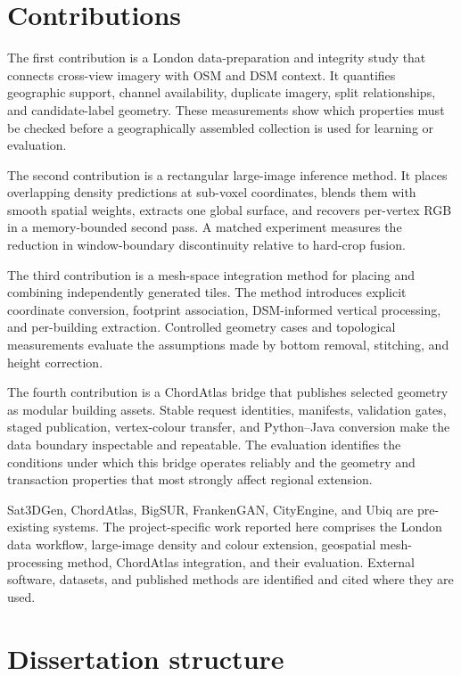 \section{Contributions}

The first contribution is a London data-preparation and integrity study that
connects cross-view imagery with OSM and DSM context.  It quantifies geographic
support, channel availability, duplicate imagery, split relationships, and
candidate-label geometry.  These measurements show which properties must be
checked before a geographically assembled collection is used for learning or
evaluation.

The second contribution is a rectangular large-image inference method.  It
places overlapping density predictions at sub-voxel coordinates, blends them
with smooth spatial weights, extracts one global surface, and recovers
per-vertex RGB in a memory-bounded second pass.  A matched experiment measures
the reduction in window-boundary discontinuity relative to hard-crop fusion.

The third contribution is a mesh-space integration method for placing and
combining independently generated tiles.  The method introduces explicit
coordinate conversion, footprint association, DSM-informed vertical
processing, and per-building extraction.  Controlled geometry cases and
topological measurements evaluate the assumptions made by bottom removal,
stitching, and height correction.

The fourth contribution is a ChordAtlas bridge that publishes selected geometry
as modular building assets.  Stable request identities, manifests, validation
gates, staged publication, vertex-colour transfer, and Python--Java conversion
make the data boundary inspectable and repeatable.  The evaluation identifies
the conditions under which this bridge operates reliably and the geometry and
transaction properties that most strongly affect regional extension.

Sat3DGen, ChordAtlas, BigSUR, FrankenGAN, CityEngine, and Ubiq are pre-existing
systems.  The project-specific work reported here comprises the London data
workflow, large-image density and colour extension, geospatial mesh-processing
method, ChordAtlas integration, and their evaluation.  External software,
datasets, and published methods are identified and cited where they are used.

\section{Dissertation structure}

